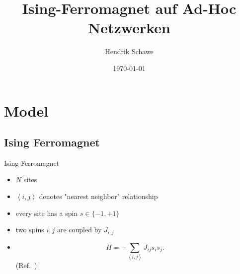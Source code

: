 \documentclass{beamer}
\title{Ising-Ferromagnet auf Ad-Hoc Netzwerken}
\author{Hendrik Schawe}
\date{\today}
\newcommand{\avg}[1]{\left< #1 \right>}
\begin{document}
\maketitle
\frame{\tableofcontents[pausesections]}

\section{Model}
    \subsection{Ising Ferromagnet}
        \begin{frame}{Ising Ferromagnet}
            \begin{itemize}[<+->]
                \item \(N\) sites
                \item \(\avg{i,j}\) denotes "nearest neighbor" relationship
                \item every site has a spin \(s \in \{-1,+1\}\){}
                \item two spins \(i,j\) are coupled by \(J_{i,j}\){}
                \item{
                    \begin{equation}
                        H = - \sum_{\avg{i,j}}J_{ij}s_{i}s_{j}.
                    \end{equation}
                    (Ref.\ \cite{Ising1925})
                }
            \end{itemize}
        \end{frame}
\end{document}
